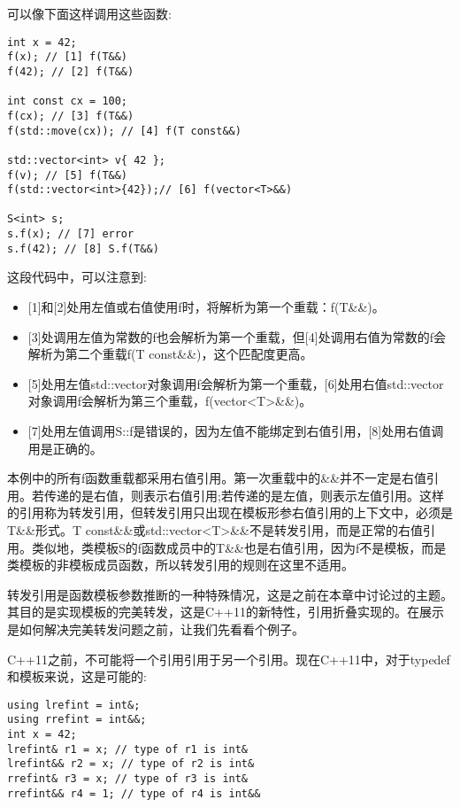 可以像下面这样调用这些函数:

\begin{lstlisting}[style=styleCXX]
int x = 42;
f(x); // [1] f(T&&)
f(42); // [2] f(T&&)

int const cx = 100;
f(cx); // [3] f(T&&)
f(std::move(cx)); // [4] f(T const&&)

std::vector<int> v{ 42 };
f(v); // [5] f(T&&)
f(std::vector<int>{42});// [6] f(vector<T>&&)

S<int> s;
s.f(x); // [7] error
s.f(42); // [8] S.f(T&&)
\end{lstlisting}

这段代码中，可以注意到:

\begin{itemize}
\item
{}[1]和[2]处用左值或右值使用f时，将解析为第一个重载：f(T\&\&)。

\item
{}[3]处调用左值为常数的f也会解析为第一个重载，但[4]处调用右值为常数的f会解析为第二个重载f(T const\&\&)，这个匹配度更高。

\item
{}[5]处用左值std::vector对象调用f会解析为第一个重载，[6]处用右值std::vector对象调用f会解析为第三个重载，f(vector<T>\&\&)。

\item
{}[7]处用左值调用S::f是错误的，因为左值不能绑定到右值引用，[8]处用右值调用是正确的。
\end{itemize}

本例中的所有f函数重载都采用右值引用。第一次重载中的\&\&并不一定是右值引用。若传递的是右值，则表示右值引用;若传递的是左值，则表示左值引用。这样的引用称为转发引用，但转发引用只出现在模板形参右值引用的上下文中，必须是T\&\&形式。T const\&\&或std::vector<T>\&\&不是转发引用，而是正常的右值引用。类似地，类模板S的f函数成员中的T\&\&也是右值引用，因为f不是模板，而是类模板的非模板成员函数，所以转发引用的规则在这里不适用。

转发引用是函数模板参数推断的一种特殊情况，这是之前在本章中讨论过的主题。其目的是实现模板的完美转发，这是C++11的新特性，引用折叠实现的。在展示是如何解决完美转发问题之前，让我们先看看个例子。

C++11之前，不可能将一个引用引用于另一个引用。现在C++11中，对于typedef和模板来说，这是可能的:

\begin{lstlisting}[style=styleCXX]
using lrefint = int&;
using rrefint = int&&;
int x = 42;
lrefint& r1 = x; // type of r1 is int&
lrefint&& r2 = x; // type of r2 is int&
rrefint& r3 = x; // type of r3 is int&
rrefint&& r4 = 1; // type of r4 is int&&
\end{lstlisting}

